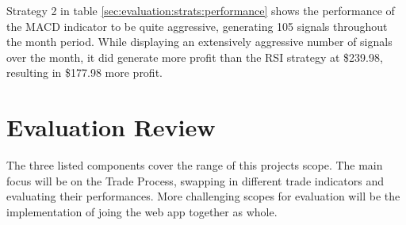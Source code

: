 Strategy 2 in table \ref{sec:evaluation:strats:performance} shows the performance of the MACD indicator to be quite aggressive, generating 105 signals throughout the month period. While displaying an extensively aggressive number of signals over the month, it did generate more profit than the RSI strategy at \$239.98, resulting in \$177.98 more profit. 
 




\section{Evaluation Review}
\label{sec:evaluation:review}

\noindent The three listed components cover the range of this projects scope. The main focus will be on the Trade Process, swapping in different trade indicators and evaluating their performances. More challenging scopes for evaluation will be the implementation of joing the web app together as whole.